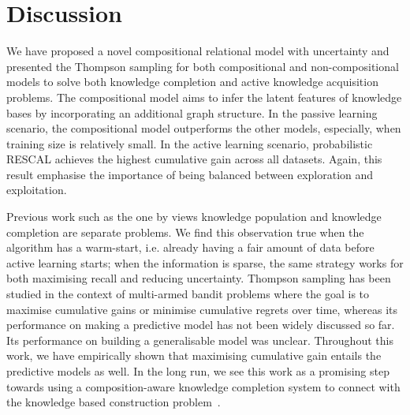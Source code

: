 \section{Discussion}
We have proposed a novel compositional relational model with uncertainty and presented the
Thompson sampling for both compositional and non-compositional models to solve both knowledge completion and active knowledge acquisition problems.
The compositional model aims to infer the latent features of knowledge 
bases by incorporating an additional graph structure. In the passive 
learning scenario, the compositional model outperforms the other models, 
especially, when training size is relatively small. 
In the active learning scenario, probabilistic RESCAL achieves the highest 
cumulative gain across all datasets. Again, this result emphasise the 
importance of being balanced between exploration and exploitation. 

Previous work such as the one by \cite{kajino2015active} 
views knowledge population 
and knowledge completion are separate problems. 
We find this observation true when the algorithm has a warm-start, 
i.e. already having a fair amount of data before active learning starts; 
when the information is sparse, the same strategy works for both maximising 
recall and reducing uncertainty.  
Thompson sampling has been studied in the context of multi-armed bandit 
problems where the goal is to maximise cumulative gains or minimise cumulative 
regrets over time, whereas its performance on making a predictive model has not 
been widely discussed so far. Its performance on building a generalisable model 
was unclear. Throughout this work, we have empirically shown that maximising 
cumulative gain entails the predictive models as well.
In the long run, we see this work as a promising step towards using a composition-aware knowledge 
completion system to connect with the 
knowledge based construction problem~\cite{dong2014knowledge}. %
